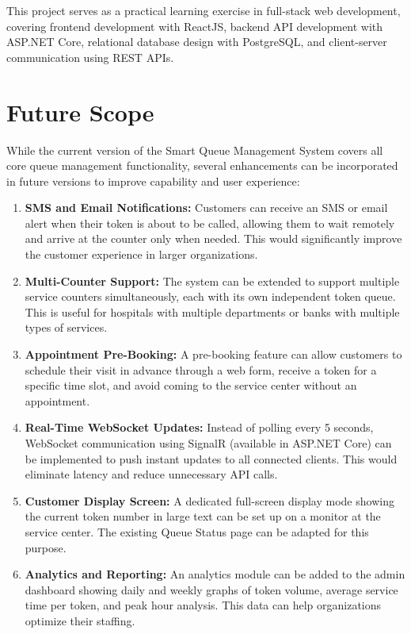 This project serves as a practical learning exercise in full-stack web development, covering frontend development with ReactJS, backend API development with ASP.NET Core, relational database design with PostgreSQL, and client-server communication using REST APIs.

\section{Future Scope}

While the current version of the Smart Queue Management System covers all core queue management functionality, several enhancements can be incorporated in future versions to improve capability and user experience:

\begin{enumerate}
    \item \textbf{SMS and Email Notifications:} Customers can receive an SMS or email alert when their token is about to be called, allowing them to wait remotely and arrive at the counter only when needed. This would significantly improve the customer experience in larger organizations.

    \item \textbf{Multi-Counter Support:} The system can be extended to support multiple service counters simultaneously, each with its own independent token queue. This is useful for hospitals with multiple departments or banks with multiple types of services.

    \item \textbf{Appointment Pre-Booking:} A pre-booking feature can allow customers to schedule their visit in advance through a web form, receive a token for a specific time slot, and avoid coming to the service center without an appointment.

    \item \textbf{Real-Time WebSocket Updates:} Instead of polling every 5 seconds, WebSocket communication using SignalR (available in ASP.NET Core) can be implemented to push instant updates to all connected clients. This would eliminate latency and reduce unnecessary API calls.

    \item \textbf{Customer Display Screen:} A dedicated full-screen display mode showing the current token number in large text can be set up on a monitor at the service center. The existing Queue Status page can be adapted for this purpose.

    \item \textbf{Analytics and Reporting:} An analytics module can be added to the admin dashboard showing daily and weekly graphs of token volume, average service time per token, and peak hour analysis. This data can help organizations optimize their staffing.


\end{enumerate}

